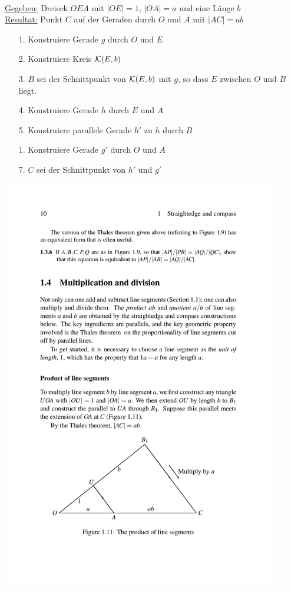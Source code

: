 \begin{konst}  
\phantom{Pups}\hspace*{1cm}\phantom{Pups}\\
\underline{Gegeben:} Dreieck $OEA$ mit $|OE|=1$, $|OA|=a$ und eine
Länge $b$\\ 
\underline{Resultat:} Punkt $C$ auf der Geraden durch $O$ und $A$ mit $|AC|=ab$ 
\begin{enumerate}
\item[1.] Konstruiere Gerade $g$ durch $O$ und $E$
\item[2.] Konstruiere Kreis ${\mathcal K}(E,b)$ 
\item[3.] $B$ sei der Schnittpunkt von ${\mathcal K}(E,b)$ mit $g$, so dass
  $E$ zwischen $O$ und $B$ liegt.
\item[4.] Konstruiere Gerade $h$ durch $E$ und $A$
\item[5.] Konstruiere parallele Gerade $h'$ zu $h$ durch $B$
\item[1.] Konstruiere Gerade $g'$ durch $O$ und $A$
\item[7.] $C$ sei der Schnittpunkt von $h'$ und $g'$ 
\end{enumerate}
\end{konst}



\centerline{\includegraphics[width=12cm]{BILDER/BildProduktVonKanten.pdf}}



